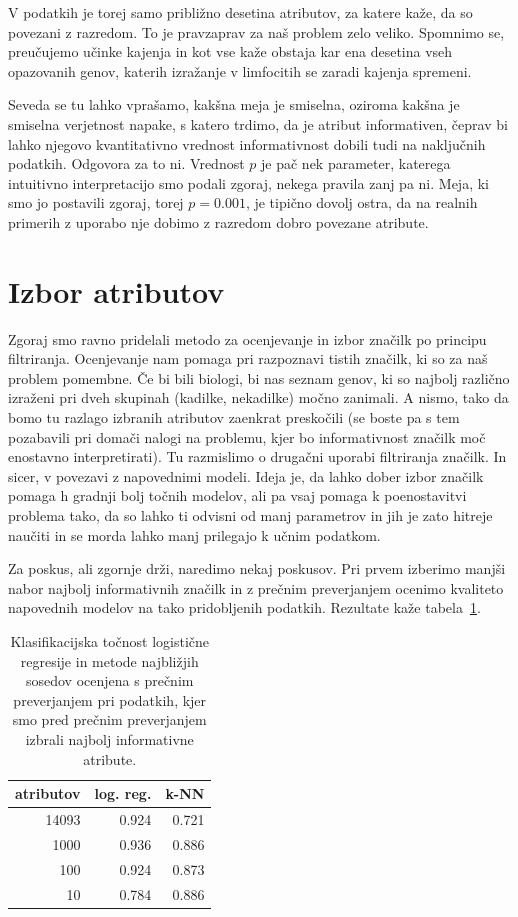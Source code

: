 V podatkih je torej samo približno desetina atributov, za katere kaže, da so povezani z razredom. To je pravzaprav za naš problem zelo veliko. Spomnimo se, preučujemo učinke kajenja in kot vse kaže obstaja kar ena desetina vseh opazovanih genov, katerih izražanje v limfocitih se zaradi kajenja spremeni.

Seveda se tu lahko vprašamo, kakšna meja je smiselna, oziroma kakšna je smiselna verjetnost napake, s katero trdimo, da je atribut informativen, čeprav bi lahko njegovo kvantitativno vrednost informativnost dobili tudi na naključnih podatkih. Odgovora za to ni. Vrednost $p$ je pač nek parameter, katerega intuitivno interpretacijo smo podali zgoraj, nekega pravila zanj pa ni. Meja, ki smo jo postavili zgoraj, torej $p=0.001$, je tipično dovolj ostra, da na realnih primerih z uporabo nje dobimo z razredom dobro povezane atribute.

\section{Izbor atributov}

Zgoraj smo ravno pridelali metodo za ocenjevanje in izbor značilk po principu filtriranja. Ocenjevanje nam pomaga pri razpoznavi tistih značilk, ki so za naš problem pomembne. Če bi bili biologi, bi nas seznam genov, ki so najbolj različno izraženi pri dveh skupinah (kadilke, nekadilke) močno zanimali. A nismo, tako da bomo tu razlago izbranih atributov zaenkrat preskočili (se boste pa s tem pozabavili pri domači nalogi na problemu, kjer bo informativnost značilk moč enostavno interpretirati). Tu razmislimo o drugačni uporabi filtriranja značilk. In sicer, v povezavi z napovednimi modeli. Ideja je, da lahko dober izbor značilk pomaga h gradnji bolj točnih modelov, ali pa vsaj pomaga k poenostavitvi problema tako, da so lahko ti odvisni od manj parametrov in jih je zato hitreje naučiti in se morda lahko manj prilegajo k učnim podatkom.

Za poskus, ali zgornje drži, naredimo nekaj poskusov. Pri prvem izberimo manjši nabor najbolj informativnih značilk in z prečnim preverjanjem ocenimo kvaliteto napovednih modelov na tako pridobljenih podatkih. Rezultate kaže tabela~\ref{t:fss-cv-false}.

\begin{table}[htbp]
  \begin{center}
    \begin{tabular}{rrr}
      \toprule
      atributov & log. reg. & k-NN \\
      \midrule
      14093 & 0.924 & 0.721 \\
      1000 & 0.936 & 0.886 \\
      100 & 0.924 & 0.873 \\
      10 & 0.784 & 0.886 \\
      \bottomrule
    \end{tabular}
  \end{center}
  \caption{Klasifikacijska točnost logistične regresije in metode najbližjih sosedov ocenjena s prečnim preverjanjem pri podatkih, kjer smo pred prečnim preverjanjem izbrali najbolj informativne atribute.}
  \label{t:fss-cv-false}
\end{table}

